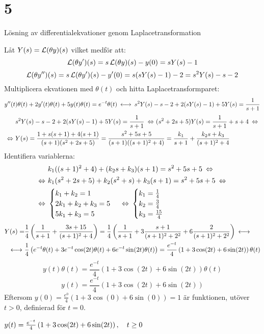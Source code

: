 \chapter{5}{Lösning av differentialekvationer genom Laplacetransformation}

\begin{task}{5.1}
	Låt $Y(s)=\operatorname{\mathcal{L}}(\theta y)(s)$ vilket medför att:
	\[\operatorname{\mathcal{L}}(\theta y')(s)=s\operatorname{\mathcal{L}}(\theta y)(s)-y(0)=sY(s)-1\]
	\[\operatorname{\mathcal{L}}(\theta y'')(s)=s\operatorname{\mathcal{L}}(\theta y')(s)-y'(0)=s(sY(s)-1)-2=s^2Y(s)-s-2\]
	Multiplicera ekvationen med $\theta(t)$ och hitta Laplacetransformparet:
	\[y''(t)\theta(t)+2y'(t)\theta(t)+5y(t)\theta(t)=e^{-t}\theta(t) \llra
	s^2Y(s)-s-2+2(sY(s)-1)+5Y(s)=\frac{1}{s+1}\]
	\begin{align*}
	&s^2Y(s)-s-2+2(sY(s)-1)+5Y(s)=\frac{1}{s+1} \lra
	(s^2+2s+5)Y(s)=\frac{1}{s+1}+s+4 \lra \\ \lra
	&Y(s)=
	\frac{1+s(s+1)+4(s+1)}{(s+1)(s^2+2s+5)}=
	\frac{s^2+5s+5}{(s+1)((s+1)^2+4)}=
	\frac{k_1}{s+1}+\frac{k_2s+k_3}{(s+1)^2+4}
	\end{align*}
	Identifiera variablerna:
	\begin{align*}
	&k_1((s+1)^2+4)+(k_2s+k_3)(s+1)=s^2+5s+5 \lra \\ \lra
	&k_1(s^2+2s+5)+k_2(s^2+s)+k_3(s+1)=s^2+5s+5 \lra \\ \lra
	&\begin{cases}
	k_1+k_2=1 \\
	2k_1+k_2+k_3=5 \\
	5k_1+k_3=5
	\end{cases} \lra
	\begin{cases}
	k_1=\frac{1}{4} \\
	k_2=\frac{3}{4} \\
	k_3=\frac{15}{4}
	\end{cases}
	\end{align*}
	\begin{align*}
	Y(s)=
	&\frac{1}{4}\left(\frac{1}{s+1}+\frac{3s+15}{(s+1)^2+4}\right)=
	\frac{1}{4}\left(\frac{1}{s+1}+3\frac{s+1}{(s+1)^2+2^2}+6\frac{2}{(s+1)^2+2^2}\right) \llra \\ \llra
	&\frac{1}{4}\left(e^{-t}\theta(t)+3e^{-t}\cos(2t)\theta(t)+6e^{-t}\sin(2t)\theta(t)\right)=
	\frac{e^{-t}}{4}\left(1+3\cos(2t)+6\sin(2t)\right)\theta(t)
	\end{align*}
	\[y(t)\theta(t)=\frac{e^{-t}}{4}\left(1+3\cos(2t)+6\sin(2t)\right)\theta(t)\]
	\[y(t)=\frac{e^{-t}}{4}\left(1+3\cos(2t)+6\sin(2t)\right)\]
	Eftersom $y(0)=\frac{e^0}{4}(1+3\cos(0)+6\sin(0))=1$ är funktionen, utöver $t>0$, definierad för $t=0$.
	
	\ans $y(t)=\frac{e^{-t}}{4}\left(1+3\cos(2t)+6\sin(2t)\right), \quad t \ge 0$
\end{task}

